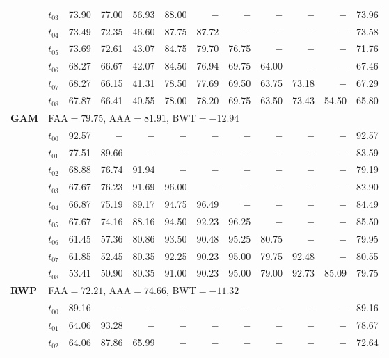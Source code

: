 \begin{table}[ht]
\begin{tabular}{@{}l l r r r r r r r r r r@{}}
 & $t_{03}$ & 73.90 & 77.00 & 56.93 & 88.00 & $-$ & $-$ & $-$ & $-$ & $-$ & 73.96 \\
 & $t_{04}$ & 73.49 & 72.35 & 46.60 & 87.75 & 87.72 & $-$ & $-$ & $-$ & $-$ & 73.58 \\
 & $t_{05}$ & 73.69 & 72.61 & 43.07 & 84.75 & 79.70 & 76.75 & $-$ & $-$ & $-$ & 71.76 \\
 & $t_{06}$ & 68.27 & 66.67 & 42.07 & 84.50 & 76.94 & 69.75 & 64.00 & $-$ & $-$ & 67.46 \\
 & $t_{07}$ & 68.27 & 66.15 & 41.31 & 78.50 & 77.69 & 69.50 & 63.75 & 73.18 & $-$ & 67.29 \\
 & $t_{08}$ & 67.87 & 66.41 & 40.55 & 78.00 & 78.20 & 69.75 & 63.50 & 73.43 & 54.50 & 65.80 \\
\midrule
\multirow{10}{*}{\textbf{GAM}} & \multicolumn{11}{l}{\quad\small FAA$=79.75$,\; AAA$=81.91$,\; BWT$=-12.94$} \\
 & $t_{00}$ & 92.57 & $-$ & $-$ & $-$ & $-$ & $-$ & $-$ & $-$ & $-$ & 92.57 \\
 & $t_{01}$ & 77.51 & 89.66 & $-$ & $-$ & $-$ & $-$ & $-$ & $-$ & $-$ & 83.59 \\
 & $t_{02}$ & 68.88 & 76.74 & 91.94 & $-$ & $-$ & $-$ & $-$ & $-$ & $-$ & 79.19 \\
 & $t_{03}$ & 67.67 & 76.23 & 91.69 & 96.00 & $-$ & $-$ & $-$ & $-$ & $-$ & 82.90 \\
 & $t_{04}$ & 66.87 & 75.19 & 89.17 & 94.75 & 96.49 & $-$ & $-$ & $-$ & $-$ & 84.49 \\
 & $t_{05}$ & 67.67 & 74.16 & 88.16 & 94.50 & 92.23 & 96.25 & $-$ & $-$ & $-$ & 85.50 \\
 & $t_{06}$ & 61.45 & 57.36 & 80.86 & 93.50 & 90.48 & 95.25 & 80.75 & $-$ & $-$ & 79.95 \\
 & $t_{07}$ & 61.85 & 52.45 & 80.35 & 92.25 & 90.23 & 95.00 & 79.75 & 92.48 & $-$ & 80.55 \\
 & $t_{08}$ & 53.41 & 50.90 & 80.35 & 91.00 & 90.23 & 95.00 & 79.00 & 92.73 & 85.09 & 79.75 \\
\midrule
\multirow{10}{*}{\textbf{RWP}} & \multicolumn{11}{l}{\quad\small FAA$=72.21$,\; AAA$=74.66$,\; BWT$=-11.32$} \\
 & $t_{00}$ & 89.16 & $-$ & $-$ & $-$ & $-$ & $-$ & $-$ & $-$ & $-$ & 89.16 \\
 & $t_{01}$ & 64.06 & 93.28 & $-$ & $-$ & $-$ & $-$ & $-$ & $-$ & $-$ & 78.67 \\
 & $t_{02}$ & 64.06 & 87.86 & 65.99 & $-$ & $-$ & $-$ & $-$ & $-$ & $-$ & 72.64 \\

\end{tabular}
\end{table}
